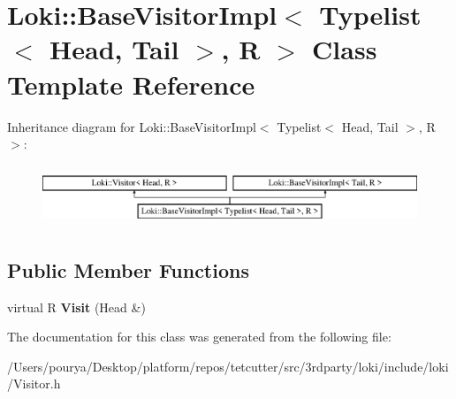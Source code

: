 \hypertarget{classLoki_1_1BaseVisitorImpl_3_01Typelist_3_01Head_00_01Tail_01_4_00_01R_01_4}{}\section{Loki\+:\+:Base\+Visitor\+Impl$<$ Typelist$<$ Head, Tail $>$, R $>$ Class Template Reference}
\label{classLoki_1_1BaseVisitorImpl_3_01Typelist_3_01Head_00_01Tail_01_4_00_01R_01_4}
Inheritance diagram for Loki\+:\+:Base\+Visitor\+Impl$<$ Typelist$<$ Head, Tail $>$, R $>$\+:\begin{figure}[H]
\begin{center}
\leavevmode
\includegraphics[height=1.854305cm]{classLoki_1_1BaseVisitorImpl_3_01Typelist_3_01Head_00_01Tail_01_4_00_01R_01_4}
\end{center}
\end{figure}
\subsection*{Public Member Functions}
\begin{DoxyCompactItemize}
\item 
\hypertarget{classLoki_1_1BaseVisitorImpl_3_01Typelist_3_01Head_00_01Tail_01_4_00_01R_01_4_ab21ea80026547e4d3c5e23c3b8916536}{}virtual R {\bfseries Visit} (Head \&)\label{classLoki_1_1BaseVisitorImpl_3_01Typelist_3_01Head_00_01Tail_01_4_00_01R_01_4_ab21ea80026547e4d3c5e23c3b8916536}

\end{DoxyCompactItemize}


The documentation for this class was generated from the following file\+:\begin{DoxyCompactItemize}
\item 
/\+Users/pourya/\+Desktop/platform/repos/tetcutter/src/3rdparty/loki/include/loki/Visitor.\+h\end{DoxyCompactItemize}
